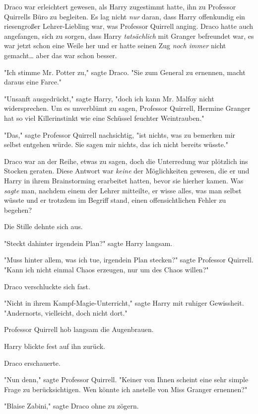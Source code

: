 {Draco war erleichtert gewesen, als Harry zugestimmt hatte, ihn zu Professor Quirrells Büro zu begleiten. Es lag nicht \emph{nur} daran, dass Harry offenkundig ein riesengroßer Lehrer-Liebling war, was Professor Quirrell anging. Draco hatte auch angefangen, sich zu sorgen, dass Harry \emph{tatsächlich} mit Granger befreundet war, es war jetzt schon eine Weile her und er hatte seinen Zug \emph{noch immer} nicht gemacht… aber das war schon besser.

"Ich stimme Mr. Potter zu," sagte Draco. "Sie zum General zu ernennen, macht daraus eine Farce."

"Unsanft ausgedrückt," sagte Harry, "doch ich kann Mr. Malfoy nicht widersprechen. Um es unverblümt zu sagen, Professor Quirrell, Hermine Granger hat so viel Killerinstinkt wie eine Schüssel feuchter Weintrauben."

"Das," sagte Professor Quirrell nachsichtig, "ist nichts, was zu bemerken mir selbst entgehen würde. Sie sagen mir nichts, das ich nicht bereits wüsste."

Draco war an der Reihe, etwas zu sagen, doch die Unterredung war plötzlich ins Stocken geraten. Diese Antwort war \emph{keine} der Möglichkeiten gewesen, die er und Harry in ihrem Brainstorming erarbeitet hatten, bevor sie hierher kamen. Was \emph{sagte} man, nachdem einem der Lehrer mitteilte, er wisse alles, was man selbst wüsste und er trotzdem im Begriff stand, einen offensichtlichen Fehler zu begehen?

Die Stille dehnte sich aus.

"Steckt dahinter irgendein Plan?" sagte Harry langsam.

"Muss hinter allem, was ich tue, irgendein Plan stecken?" sagte Professor Quirrell. "Kann ich nicht einmal Chaos erzeugen, nur um des Chaos willen?"

Draco verschluckte sich fast.

"Nicht in ihrem Kampf-Magie-Unterricht," sagte Harry mit ruhiger Gewissheit. "Andernorts, vielleicht, doch nicht dort."

Professor Quirrell hob langsam die Augenbrauen.

Harry blickte fest auf ihn zurück.

Draco erschauerte.

"Nun denn," sagte Professor Quirrell. "Keiner von Ihnen scheint eine sehr simple Frage zu berücksichtigen. Wen könnte ich anstelle von Miss Granger ernennen?"

"Blaise Zabini," sagte Draco ohne zu zögern.

}
